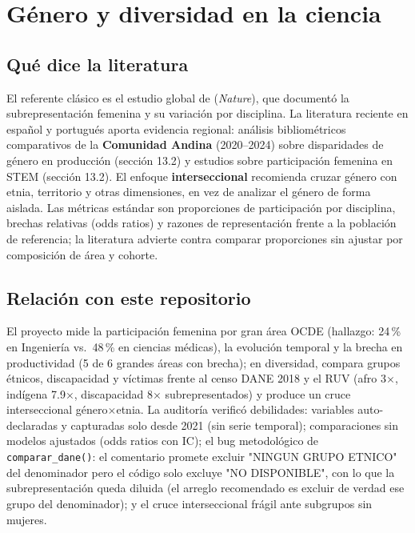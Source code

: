 \section{Género y diversidad en la ciencia}

\subsection{Qué dice la literatura}

El referente clásico es el estudio global de \citet{lariviere2013global}
(\emph{Nature}), que documentó la subrepresentación femenina y su variación por
disciplina. La literatura reciente en español y portugués aporta evidencia
regional: análisis bibliométricos comparativos de la \textbf{Comunidad Andina}
(2020--2024) sobre disparidades de género en producción (sección 13.2) y
estudios sobre participación femenina en STEM (sección 13.2). El enfoque
\textbf{interseccional} \citep{crenshaw1989demarginalizing} recomienda cruzar
género con etnia, territorio y otras dimensiones, en vez de analizar el género
de forma aislada. Las métricas estándar son proporciones de participación por
disciplina, brechas relativas (odds ratios) y razones de representación frente
a la población de referencia; la literatura advierte contra comparar
proporciones sin ajustar por composición de área y cohorte.

\subsection{Relación con este repositorio}

El proyecto mide la participación femenina por gran área OCDE (hallazgo: 24\,\%
en Ingeniería vs.\ 48\,\% en ciencias médicas), la evolución temporal y la
brecha en productividad (5 de 6 grandes áreas con brecha); en diversidad,
compara grupos étnicos, discapacidad y víctimas frente al censo DANE 2018 y el
RUV (afro 3$\times$, indígena 7.9$\times$, discapacidad 8$\times$
subrepresentados) y produce un cruce interseccional género$\times$etnia. La
auditoría verificó debilidades: variables auto-declaradas y capturadas solo
desde 2021 (sin serie temporal); comparaciones sin modelos ajustados (odds
ratios con IC); el bug metodológico de \texttt{comparar\_dane()}: el comentario
promete excluir "NINGUN GRUPO ETNICO" del denominador pero el código solo
excluye "NO DISPONIBLE", con lo que la subrepresentación queda diluida (el
arreglo recomendado es excluir de verdad ese grupo del denominador); y el cruce
interseccional frágil ante subgrupos sin mujeres.

